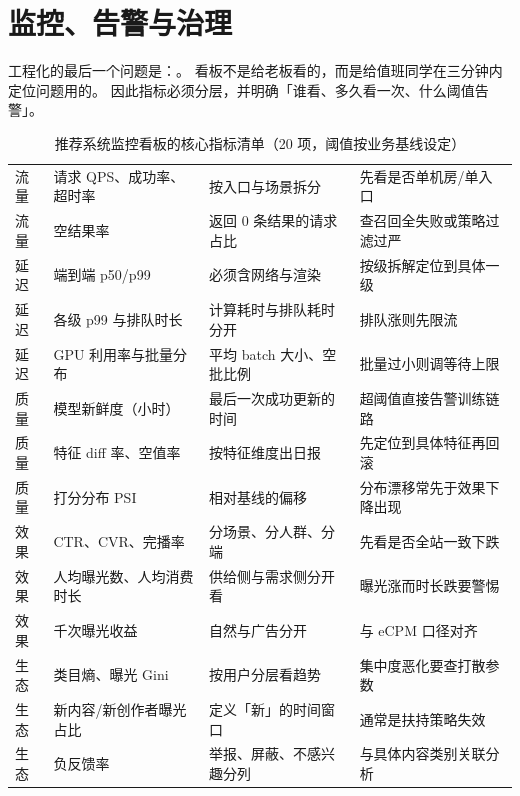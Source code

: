 \section{监控、告警与治理}

工程化的最后一个问题是：。
看板不是给老板看的，而是给值班同学在三分钟内定位问题用的。
因此指标必须分层，并明确「谁看、多久看一次、什么阈值告警」。

\begin{table}[htbp]
\centering
\caption{推荐系统监控看板的核心指标清单（20 项，阈值按业务基线设定）}
\label{tab:monitor-metrics}
\small
\begin{tabularx}{\textwidth}{L{1.9cm} L{3.0cm} L{2.6cm} Y}
\toprule
{} &  &  &  \\
\midrule
流量 & 请求 QPS、成功率、超时率 & 按入口与场景拆分 & 先看是否单机房/单入口 \\
\addlinespace
流量 & 空结果率 & 返回 0 条结果的请求占比 & 查召回全失败或策略过滤过严 \\
\addlinespace
延迟 & 端到端 p50/p99 & 必须含网络与渲染 & 按级拆解定位到具体一级 \\
\addlinespace
延迟 & 各级 p99 与排队时长 & 计算耗时与排队耗时分开 & 排队涨则先限流 \\
\addlinespace
延迟 & GPU 利用率与批量分布 & 平均 batch 大小、空批比例 & 批量过小则调等待上限 \\
\addlinespace
质量 & 模型新鲜度（小时） & 最后一次成功更新的时间 & 超阈值直接告警训练链路 \\
\addlinespace
质量 & 特征 diff 率、空值率 & 按特征维度出日报 & 先定位到具体特征再回滚 \\
\addlinespace
质量 & 打分分布 PSI & 相对基线的偏移 & 分布漂移常先于效果下降出现 \\
\addlinespace
效果 & CTR、CVR、完播率 & 分场景、分人群、分端 & 先看是否全站一致下跌 \\
\addlinespace
效果 & 人均曝光数、人均消费时长 & 供给侧与需求侧分开看 & 曝光涨而时长跌要警惕 \\
\addlinespace
效果 & 千次曝光收益 & 自然与广告分开 & 与 eCPM 口径对齐 \\
\addlinespace
生态 & 类目熵、曝光 Gini & 按用户分层看趋势 & 集中度恶化要查打散参数 \\
\addlinespace
生态 & 新内容/新创作者曝光占比 & 定义「新」的时间窗口 & 通常是扶持策略失效 \\
\addlinespace
生态 & 负反馈率 & 举报、屏蔽、不感兴趣分列 & 与具体内容类别关联分析 \\

\end{tabularx}
\end{table}
